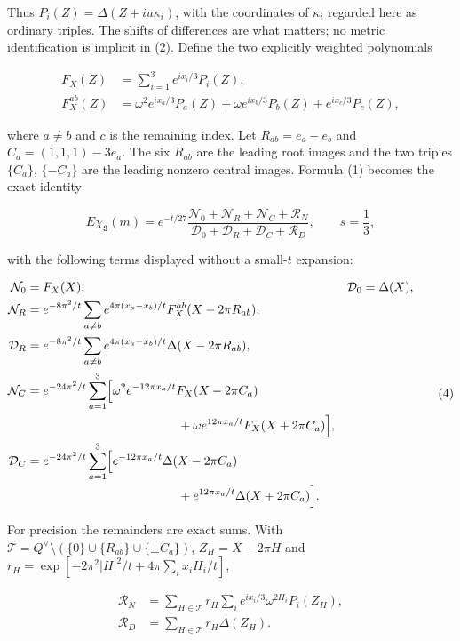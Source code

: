 \documentclass[11pt,a4paper]{article}
\begin{document}
Thus \(P_i(Z)=\Delta(Z+iu\kappa_i)\), with the coordinates of
\(\kappa_i\) regarded here as ordinary triples. The shifts of
differences are what matters; no metric identification is implicit in
(2). Define the two explicitly weighted polynomials

\[\begin{aligned}
F_X(Z)&=\sum_{i=1}^3 e^{ix_i/3}P_i(Z),\\
F_X^{ab}(Z)&=\omega^2e^{ix_a/3}P_a(Z)
+\omega e^{ix_b/3}P_b(Z)+e^{ix_c/3}P_c(Z),
\end{aligned}\]

where \(a\ne b\) and \(c\) is the remaining index. Let
\(R_{ab}=e_a-e_b\) and \(C_a=(1,1,1)-3e_a\). The six \(R_{ab}\) are the
leading root images and the two triples \(\{C_a\}\), \(\{-C_a\}\) are
the leading nonzero central images. Formula (1) becomes the exact
identity

\[E\chi_{\mathbf3}(m)=e^{-t/27}
\frac{\mathcal N_0+\mathcal N_R+\mathcal N_C+\mathcal R_N}
{\mathcal D_0+\mathcal D_R+\mathcal D_C+\mathcal R_D},
\qquad s=\frac13,\tag{3}\]

with the following terms displayed without a small-\(t\) expansion:

\[\begin{aligned}
\mathcal N_0&=F_X(X),&\mathcal D_0&=\Delta(X),\\
\mathcal N_R&=e^{-8\pi^2/t}\sum_{a\ne b}
e^{4\pi(x_a-x_b)/t}F_X^{ab}(X-2\pi R_{ab}),\\
\mathcal D_R&=e^{-8\pi^2/t}\sum_{a\ne b}
e^{4\pi(x_a-x_b)/t}\Delta(X-2\pi R_{ab}),\\
\mathcal N_C&=e^{-24\pi^2/t}\sum_{a=1}^3
\Bigl[\omega^2e^{-12\pi x_a/t}F_X(X-2\pi C_a)\\
&\hspace{43mm}+\omega e^{12\pi x_a/t}F_X(X+2\pi C_a)\Bigr],\\
\mathcal D_C&=e^{-24\pi^2/t}\sum_{a=1}^3
\Bigl[e^{-12\pi x_a/t}\Delta(X-2\pi C_a)\\
&\hspace{43mm}+e^{12\pi x_a/t}\Delta(X+2\pi C_a)\Bigr].
\end{aligned}\tag{4}\]

For precision the remainders are exact sums. With
\(\mathcal T=Q^\vee\setminus(\{0\}\cup\{R_{ab}\}\cup\{\pm C_a\})\),
\(Z_H=X-2\pi H\) and \(r_H=\exp[-2\pi^2|H|^2/t+4\pi\sum_i x_iH_i/t]\),

\[\begin{aligned}
\mathcal R_N&=\sum_{H\in\mathcal T}r_H
\sum_i e^{ix_i/3}\omega^{2H_i}P_i(Z_H),\\
\mathcal R_D&=\sum_{H\in\mathcal T}r_H\Delta(Z_H).
\end{aligned}\tag{5}\]
\end{document}
